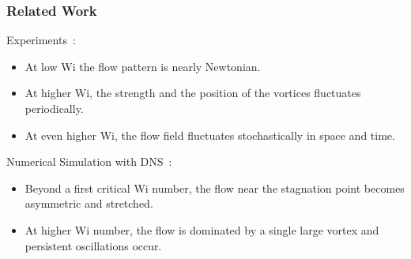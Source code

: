 \begin{frame}
  \frametitle{Related Work}
  \begin{block}{Experiments~\footnotemark[1]:}
    \begin{itemize}
    \item  At low Wi the flow pattern is nearly Newtonian. 
    \item At higher Wi, the strength and the position of the vortices fluctuates periodically.
    \item At even higher Wi, the flow field fluctuates stochastically in space and time.
    \end{itemize}
  \end{block}
  \begin{block}{Numerical Simulation with DNS~\footnotemark[2]: }
    \begin{itemize}
    \item Beyond a first critical Wi number, the flow near the stagnation point becomes asymmetric and stretched.
    \item At higher Wi number, the flow is dominated by a single large vortex and persistent oscillations occur. 
    \end{itemize}
  \end{block}
\end{frame}

